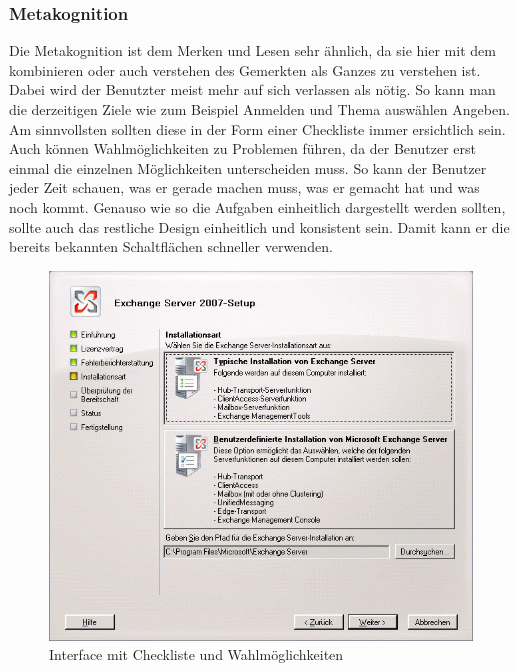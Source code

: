 \subsubsection{Metakognition}
Die Metakognition ist dem Merken und Lesen sehr ähnlich, da sie hier mit dem kombinieren oder auch verstehen des Gemerkten als Ganzes zu verstehen ist. Dabei wird der Benutzter meist mehr auf sich verlassen als nötig. So kann man die derzeitigen Ziele wie zum Beispiel Anmelden und Thema auswählen Angeben. Am sinnvollsten sollten diese in der Form einer Checkliste immer ersichtlich sein. Auch können Wahlmöglichkeiten zu Problemen führen, da der Benutzer erst einmal die einzelnen Möglichkeiten unterscheiden muss. So kann der Benutzer jeder Zeit schauen, was er gerade machen muss, was er gemacht hat und was noch kommt. Genauso wie so die Aufgaben einheitlich dargestellt werden sollten, sollte auch das restliche Design einheitlich und konsistent sein. Damit kann er die bereits bekannten Schaltflächen schneller verwenden.\\
\begin{figure}[h]
	\centering
		\includegraphics[width=1.00\textwidth]{Daten/ServerBeispiel.png}
	\caption{Interface mit Checkliste und Wahlmöglichkeiten}
	\label{fig:InstallBsp}
\end{figure}


